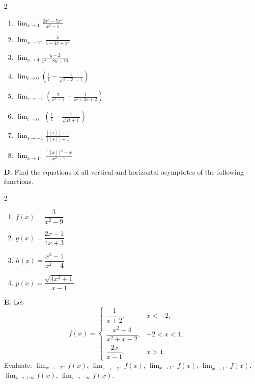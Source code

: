\begin{multicols}{2}
\begin{enumerate}[label=\arabic*., nosep, topsep=0pt, itemsep=2pt]
    \item \(\displaystyle\lim_{x \to 1} \frac{2x^{3} - 5x^{2}}{x^{2} - 1}\)
    \item \(\displaystyle\lim_{x \to 2^{+}} \frac{4}{4 - 4x + x^{2}}\)
    \item \(\displaystyle\lim_{y \to 4} \frac{y - 2}{y^{2} - 8y + 16}\)
    \item \(\displaystyle\lim_{t \to 0} \left( \frac{1}{t} - \frac{1}{\sqrt{t + 3} - 1} \right)\)
    \item \(\displaystyle\lim_{s \to -1} \left( \frac{2}{s^{2} - 1} + \frac{1}{s^{2} + 3s + 2} \right)\)
    \item \(\displaystyle\lim_{t \to 0^{+}} \left( \frac{1}{t} - \frac{1}{\sqrt{2t + 1}} \right)\)
    \item \(\displaystyle\lim_{s \to -1} \frac{[\![s]\!] - 1}{[\![s]\!] + 1}\)
    \item \(\displaystyle\lim_{x \to 1^{+}} \frac{[\![x]\!]^{2} - x}{x^{2} - 1}\)
\end{enumerate}
\end{multicols}

\medskip
\noindent\textbf{D.} Find the equations of all vertical and horizontal asymptotes of the following functions.

\begin{multicols}{2}
\begin{enumerate}[label=\arabic*., nosep, topsep=0pt, itemsep=2pt]
    \item \(f(x) = \dfrac{3}{x^{2} - 9}\)
    \item \(g(x) = \dfrac{2x - 1}{4x + 3}\)
    \item \(h(x) = \dfrac{x^{2} - 1}{x^{2} - 4}\)
    \item \(p(x) = \dfrac{\sqrt{4x^{2} + 1}}{x - 1}\)
\end{enumerate}
\end{multicols}

\medskip
\noindent\textbf{E.} Let
\[
f(x) = \begin{cases}
\dfrac{1}{x + 2},           & x < -2, \\[10pt]
\dfrac{x^{2} - 4}{x^{2} + x - 2}, & -2 < x < 1, \\[10pt]
\dfrac{2x}{x - 1},           & x > 1.
\end{cases}
\]
Evaluate:
\(\displaystyle\lim_{x \to -2^{-}} f(x)\), \quad
\(\displaystyle\lim_{x \to -2^{+}} f(x)\), \quad
\(\displaystyle\lim_{x \to 1^{-}} f(x)\), \quad
\(\displaystyle\lim_{x \to 1^{+}} f(x)\), \quad
\(\displaystyle\lim_{x \to +\infty} f(x)\), \quad
\(\displaystyle\lim_{x \to -\infty} f(x)\).